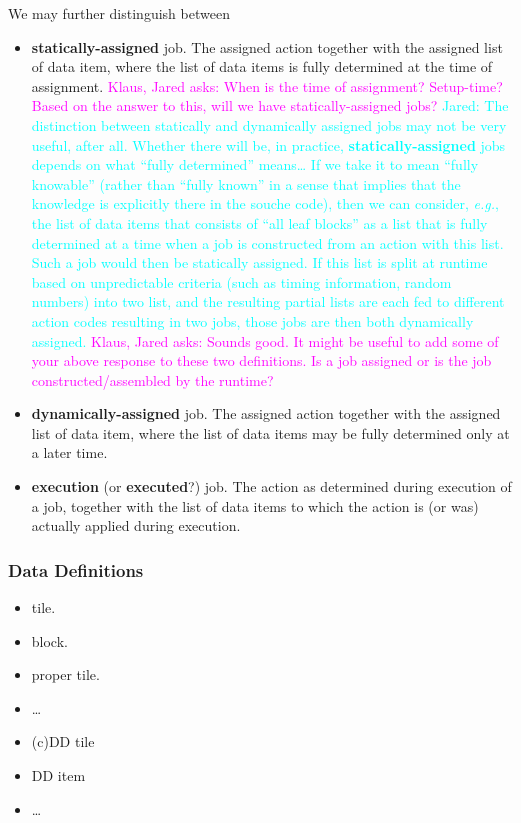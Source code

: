 \documentclass{article}
\newcommand{\eg}{\textit{e.g.}}   %
\newcommand{\Jared}[1]          {\textcolor{cyan}{Jared: #1}}
\newcommand{\KlausQfromJO}[1]   {\textcolor{magenta}{Klaus, Jared asks: #1}}
\begin{document}
\begin{itemize}
We may further distinguish between
\begin{itemize}
\item \textbf{statically-assigned} job. The assigned action together with
the assigned list of data item, where the list of data items is fully
determined at the time of assignment. \KlausQfromJO{When is the time of
assignment?  Setup-time?  Based on the answer to this, will we have
statically-assigned jobs?}
\Jared{The distinction between statically and dynamically assigned jobs
may not be very useful, after all. Whether there will be, in practice,
\textbf{statically-assigned} jobs depends on what ``fully determined''
means\ldots
If we take it to mean ``fully knowable'' (rather than ``fully known''
in a sense that implies that the knowledge is explicitly there in the souche code),
then we can consider, \eg, the list of data items that consists of ``all
leaf blocks'' as a list that is fully determined at a time when
a job is constructed from an action with this list.
Such a job would then be statically assigned.
If this list is split at runtime based on unpredictable criteria
(such as timing information, random numbers) into two list,
and the resulting partial lists are each fed to different
action codes resulting in two jobs, those jobs are then both
dynamically assigned.
}
\KlausQfromJO{Sounds good.  It might be useful to add some of your above response to these
two definitions.  Is a job assigned or is the job constructed/assembled by the
runtime?}
\item \textbf{dynamically-assigned} job. The assigned action together with
the assigned list of data item, where the list of data items may be fully
determined only at a later time.
\item \textbf{execution} (or \textbf{executed}?) job. The action as
determined during execution of a job, together with
the list of data items to which the action is (or was) actually
applied during execution.
\end{itemize}

\end{itemize}

\subsubsection{Data Definitions}
\begin{itemize}
\item tile.
\item block.
\item proper tile.
\item \ldots
\item (c)DD tile
\item DD item
\item \ldots
\end{itemize}
\end{document}
